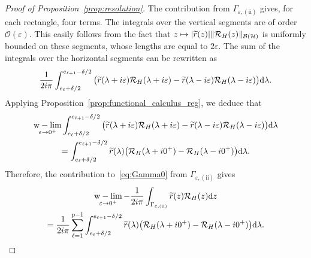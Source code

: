 \documentclass[AHL,Unicode,longabstracts,published]{cedram}
\newcommand{\Hi}{\mathcal{H}}
\newcommand{\rmd}{\mathrm{d}}
\newcommand{\Res}{\mathcal{R}}
\newcommand{\clB}{\mathcal{B}}
\DeclareMathOperator{\wlim}{w-lim}
\let\oldtilde\tilde
\renewcommand*{\tilde}[1]{\mathchoice{\widetilde{#1}}{\widetilde{#1}}{\oldtilde{#1}}{\oldtilde{#1}}}
\newcommand{\Hi}{\mathcal{H}}
\begin{document}
\begin{proof}[Proof of Proposition~\ref{prop:resolution}]
The contribution from $\Gamma_{\varepsilon,\mathrm{(ii)}}$ gives, for each rectangle, four terms. The integrals over the vertical segments are of order $\mathcal{O}(\varepsilon)$. This easily follows from the fact that $z\mapsto|\tilde r(z)|\|\Res_H(z)\|_{\clB(\Hi)}$ is uniformly bounded on these segments, whose lengths are equal to $2\varepsilon$. The sum of the integrals over the horizontal segments can be rewritten as
\begin{align*}
\frac{1}{2i\pi}\int_{e_\ell+\delta/2}^{e_{\ell+1}-\delta/2} \big(\tilde r(\lambda+i\varepsilon) \Res_H(\lambda+i\varepsilon) - \tilde r(\lambda-i\varepsilon) \Res_H(\lambda-i\varepsilon) \big) \rmd \lambda.
\end{align*}
Applying Proposition~\ref{prop:functional_calculus_reg}, we deduce that
\begin{multline*}
\wlim_{\varepsilon\rightarrow 0^+} \int_{e_\ell+\delta/2}^{e_{\ell+1}-\delta/2} \big(\tilde r(\lambda+i\varepsilon) \Res_H(\lambda+i\varepsilon) - \tilde r(\lambda-i\varepsilon) \Res_H(\lambda-i\varepsilon) \big)\rmd \lambda \\
= \int_{e_\ell+\delta/2}^{e_{\ell+1}-\delta/2} \tilde r(\lambda) \big(\Res_H(\lambda+i0^+) - \Res_H(\lambda-i0^+) \big) \rmd \lambda.
\end{multline*}
Therefore, the contribution to~\eqref{eq:Gamma0} from $\Gamma_{\varepsilon,\mathrm{(ii)}}$ gives
\begin{multline}\label{eq:Gamma2}
\wlim_{\varepsilon\rightarrow 0^+} - \frac{1}{2i\pi} \int_{\Gamma_{\varepsilon,\mathrm{(ii)}}}\tilde r(z) \Res_H(z) \rmd z \\
= \frac{1}{2i\pi} \sum_{\ell=1}^{p-1}\int_{e_\ell+\delta/2}^{e_{\ell+1}-\delta/2} \tilde r(\lambda) \big(\Res_H(\lambda+i0^+) - \Res_H(\lambda-i0^+) \big) \rmd \lambda. 
\end{multline}


\end{proof}
\end{document}
